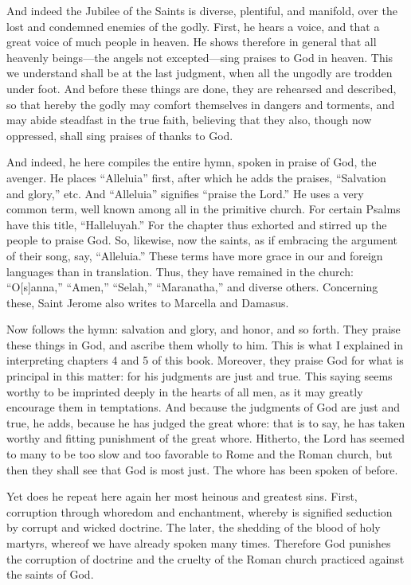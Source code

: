 And indeed the Jubilee of the Saints is diverse, plentiful, and manifold, over the lost and condemned enemies of the godly. First, he hears a voice, and that a great voice of much people in heaven. He shows therefore in general that all heavenly beings—the angels not excepted—sing praises to God in heaven. This we understand shall be at the last judgment, when all the ungodly are trodden under foot. And before these things are done, they are rehearsed and described, so that hereby the godly may comfort themselves in dangers and torments, and may abide steadfast in the true faith, believing that they also, though now oppressed, shall sing praises of thanks to God.

And indeed, he here compiles the entire hymn, spoken in praise of God, the avenger. He places “Alleluia” first, after which he adds the praises, “Salvation and glory,” etc. And “Alleluia” signifies “praise the Lord.” He uses a very common term, well known among all in the primitive church. For certain Psalms have this title, “Halleluyah.” For the chapter thus exhorted and stirred up the people to praise God. So, likewise, now the saints, as if embracing the argument of their song, say, “Alleluia.” These terms have more grace in our and foreign languages than in translation. Thus, they have remained in the church: “O[s]anna,” “Amen,” “Selah,” “Maranatha,” and diverse others. Concerning these, Saint Jerome also writes to Marcella and Damasus.

Now follows the hymn: salvation and glory, and honor, and so forth. They praise these things in God, and ascribe them wholly to him. This is what I explained in interpreting chapters 4 and 5 of this book. Moreover, they praise God for what is principal in this matter: for his judgments are just and true. This saying seems worthy to be imprinted deeply in the hearts of all men, as it may greatly encourage them in temptations. And because the judgments of God are just and true, he adds, because he has judged the great whore: that is to say, he has taken worthy and fitting punishment of the great whore. Hitherto, the Lord has seemed to many to be too slow and too favorable to Rome and the Roman church, but then they shall see that God is most just. The whore has been spoken of before.

Yet does he repeat here again her most heinous and greatest sins. First, corruption through whoredom and enchantment, whereby is signified seduction by corrupt and wicked doctrine. The later, the shedding of the blood of holy martyrs, whereof we have already spoken many times. Therefore God punishes the corruption of doctrine and the cruelty of the Roman church practiced against the saints of God.

